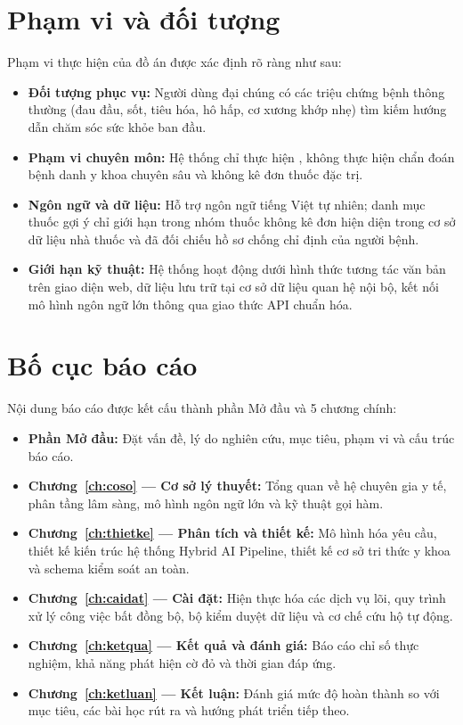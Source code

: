 \section*{Phạm vi và đối tượng}
{}

Phạm vi thực hiện của đồ án được xác định rõ ràng như sau:
\begin{itemize}[leftmargin=1.6em, itemsep=2pt]
  \item \textbf{Đối tượng phục vụ:} Người dùng đại chúng có các triệu chứng bệnh
        thông thường (đau đầu, sốt, tiêu hóa, hô hấp, cơ xương khớp nhẹ) tìm
        kiếm hướng dẫn chăm sóc sức khỏe ban đầu.
  \item \textbf{Phạm vi chuyên môn:} Hệ thống chỉ thực hiện  , không thực hiện chẩn
        đoán bệnh danh y khoa chuyên sâu và không kê đơn thuốc đặc trị.
  \item \textbf{Ngôn ngữ và dữ liệu:} Hỗ trợ ngôn ngữ tiếng Việt tự nhiên; danh
        mục thuốc gợi ý chỉ giới hạn trong nhóm thuốc không kê đơn 
        hiện diện trong cơ sở dữ liệu nhà thuốc và đã đối chiếu hồ sơ chống chỉ
        định của người bệnh.
  \item \textbf{Giới hạn kỹ thuật:} Hệ thống hoạt động dưới hình thức tương tác
        văn bản trên giao diện web, dữ liệu lưu trữ tại cơ sở dữ liệu quan hệ nội
        bộ, kết nối mô hình ngôn ngữ lớn thông qua giao thức API chuẩn hóa.
\end{itemize}

\section*{Bố cục báo cáo}
{}

Nội dung báo cáo được kết cấu thành phần Mở đầu và 5 chương chính:
\begin{itemize}[leftmargin=1.6em, itemsep=0pt]
  \item \textbf{Phần Mở đầu:} Đặt vấn đề, lý do nghiên cứu, mục tiêu, phạm vi và cấu trúc báo cáo.
  \item \textbf{Chương~\ref{ch:coso} — Cơ sở lý thuyết:} Tổng quan về hệ chuyên gia
        y tế, phân tầng lâm sàng, mô hình ngôn ngữ lớn và kỹ thuật gọi hàm.
  \item \textbf{Chương~\ref{ch:thietke} — Phân tích và thiết kế:} Mô hình hóa yêu
        cầu, thiết kế kiến trúc hệ thống Hybrid AI Pipeline, thiết kế cơ sở tri
        thức y khoa và schema kiểm soát an toàn.
  \item \textbf{Chương~\ref{ch:caidat} — Cài đặt:} Hiện thực hóa các dịch vụ lõi,
        quy trình xử lý công việc bất đồng bộ, bộ kiểm duyệt dữ liệu và cơ chế
        cứu hộ tự động.
  \item \textbf{Chương~\ref{ch:ketqua} — Kết quả và đánh giá:} Báo cáo chỉ số
        thực nghiệm, khả năng phát hiện cờ đỏ và thời gian đáp ứng.
  \item \textbf{Chương~\ref{ch:ketluan} — Kết luận:} Đánh giá mức độ hoàn thành so
        với mục tiêu, các bài học rút ra và hướng phát triển tiếp theo.
\end{itemize}
